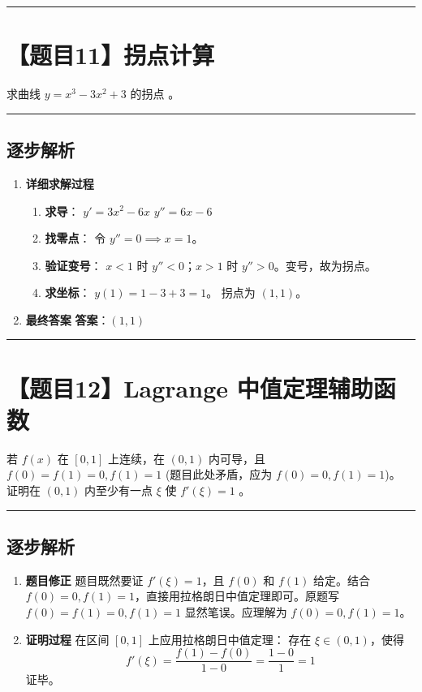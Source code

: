\documentclass[UTF8]{ctexart}
\newenvironment{redenv}{\color{red}}{}
\newenvironment{detailedanalysis}{%
    \color{red}
    \begin{enumerate}[label=\textbf{第\arabic*步：}, leftmargin=*, align=left, itemsep=1.5ex]
}{%
    \end{enumerate}
}
\newcommand{\problemrule}{\noindent\rule{\textwidth}{1.5pt}\vspace{-0.8em}}
\newcommand{\analysisrule}{\noindent\rule{\textwidth}{0.8pt}\vspace{-0.8em}}
\newcommand{\blank}[1]{\underline{\hspace{#1}}}
\begin{document}
\problemrule
\section*{【题目11】拐点计算}
求曲线 $ y = x^{3} - 3x^{2} + 3 $ 的拐点 \blank{2cm}。

\begin{redenv}
\analysisrule
\subsection*{逐步解析}

\begin{detailedanalysis}
\item \textbf{详细求解过程}
\begin{enumerate}[label=(\arabic*)]
\item \textbf{求导}：
$y' = 3x^2 - 6x$
$y'' = 6x - 6$
\item \textbf{找零点}：
令 $y'' = 0 \implies x = 1$。
\item \textbf{验证变号}：
$x < 1$ 时 $y'' < 0$；$x > 1$ 时 $y'' > 0$。变号，故为拐点。
\item \textbf{求坐标}：
$y(1) = 1 - 3 + 3 = 1$。
拐点为 $(1, 1)$。
\end{enumerate}

\item \textbf{最终答案}
\textbf{答案}：$ (1,1) $
\end{detailedanalysis}
\end{redenv}

\problemrule
\section*{【题目12】Lagrange 中值定理辅助函数}
若 $ f(x) $ 在 $ [0,1] $ 上连续，在 $ (0,1) $ 内可导，且 $ f(0)=f(1)=0, f(1)=1 $ (题目此处矛盾，应为 $f(0)=0, f(1)=1$)。
证明在 $ (0,1) $ 内至少有一点 $ \xi $ 使 $ f'(\xi)=1 $ 。

\begin{redenv}
\analysisrule
\subsection*{逐步解析}

\begin{detailedanalysis}
\item \textbf{题目修正}
题目既然要证 $f'(\xi)=1$，且 $f(0)$ 和 $f(1)$ 给定。结合 $f(0)=0, f(1)=1$，直接用拉格朗日中值定理即可。原题写 $f(0)=f(1)=0, f(1)=1$ 显然笔误。应理解为 $f(0)=0, f(1)=1$。
\item \textbf{证明过程}
在区间 $[0, 1]$ 上应用拉格朗日中值定理：
存在 $\xi \in (0, 1)$，使得
$$ f'(\xi) = \frac{f(1) - f(0)}{1 - 0} = \frac{1 - 0}{1} = 1 $$
证毕。
\end{detailedanalysis}
\end{redenv}
\end{document}
